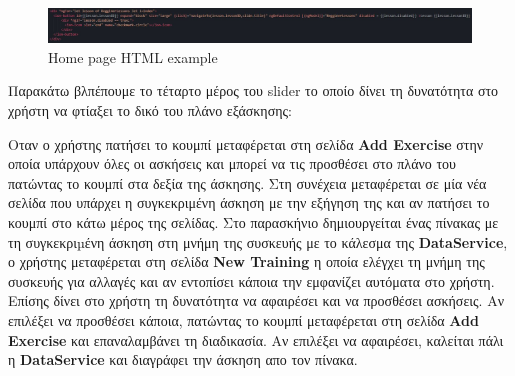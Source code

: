 \documentclass[a4paper,12pt]{article}
\begin{document}
			\vspace*{1cm}

			\begin{figure}[!htb]
				\begin{center}
					\caption{Home page HTML example}
					\vspace*{0.5cm}

					\includegraphics[width=\linewidth]{homeHtml} 
				\end{center}
			\end{figure}

			Παρακάτω βλπέπουμε το τέταρτο μέρος του slider το οποίο δίνει τη δυνατότητα στο χρήστη να φτίαξει το δικό του πλάνο εξάσκησης:
			
			\newpage
			Οταν ο χρήστης πατήσει το κουμπί μεταφέρεται στη σελίδα \textbf{Add Exercise} στην οποία υπάρχουν όλες οι ασκήσεις και μπορεί να τις προσθέσει 
			στο πλάνο του πατώντας το κουμπί στα δεξία της άσκησης. Στη συνέχεια μεταφέρεται σε μία νέα σελίδα που υπάρχει η συγκεκριμένη άσκηση με την εξήγηση της και αν πατήσει το κουμπί
			στο κάτω μέρος της σελίδας. Στο παρασκήνιο δημιουργείται ένας πίνακας με τη συγκεκριµένη άσκηση στη μνήμη της συσκευής με το κάλεσμα της \textbf{DataService},
			ο χρήστης μεταφέρεται στη σελίδα \textbf{New Training}
			η οποία ελέγχει τη μνήμη της συσκευής για αλλαγές και αν εντοπίσει κάποια την εμφανίζει αυτόματα στο χρήστη. Επίσης
			δίνει στο χρήστη τη δυνατότητα να αφαιρέσει και να προσθέσει ασκήσεις. Αν επιλέξει να προσθέσει κάποια, πατώντας το κουμπί
			μεταφέρεται στη σελίδα \textbf{Add Exercise} και επαναλαμβάνει τη διαδικασία. Αν επιλέξει να αφαιρέσει, καλείται πάλι 
			η \textbf{DataService} και διαγράφει την άσκηση απο τον πίνακα.
			
			\vspace*{1cm}
\end{document}
